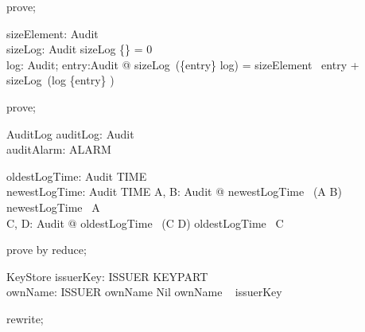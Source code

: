 \begin{zproof}
prove;
\end{zproof}

\begin{axdef}
    sizeElement: Audit \fun \nat \\
    sizeLog: \finset Audit \fun \nat
\where
        sizeLog \{\} = 0 \\

     \forall log: \finset Audit; entry:Audit @
        sizeLog~(\{entry\} \cup log) =
           sizeElement~ entry +
           sizeLog~(log \setminus \{entry\} )
\end{axdef}

\begin{zproof}
prove;
\end{zproof}

\begin{schema}{AuditLog}
  auditLog: \finset  Audit\\
  auditAlarm: ALARM
\end{schema}

\begin{axdef}
  oldestLogTime: \finset  Audit \fun  TIME\\
  newestLogTime: \finset  Audit \fun  TIME
\where
  \forall  A, B: \finset  Audit @ newestLogTime~ (A \cup  B) \geq  newestLogTime~ A
    \\
  \forall C, D: \finset Audit @ oldestLogTime~ (C \cup  D) \leq  oldestLogTime~ C
\end{axdef}

\begin{zproof}
prove by reduce;
\end{zproof}

\begin{schema}{KeyStore}
  issuerKey: ISSUER \pfun  KEYPART\\
  ownName: \Optional ISSUER
\where
  ownName \neq  Nil \implies  \The ownName \in  \dom~  issuerKey
\end{schema}

\begin{zproof}
rewrite;
\end{zproof}

